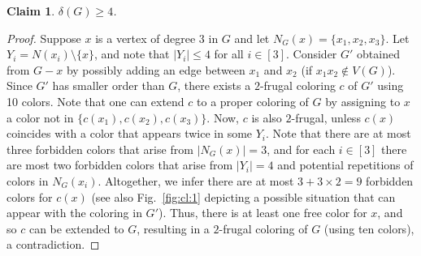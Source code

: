\documentclass[11pt]{article}
\newtheorem{claim}{Claim}
\begin{document}

\begin{claim} $\delta(G)\ge 4$.
\label{cl:1}
\end{claim} 
\begin{proof}
Suppose $x$ is a vertex of degree $3$ in $G$ and let $N_G(x)=\{x_1,x_2,x_3\}$. Let $Y_i=N(x_i)\setminus\{x\}$, and note that $|Y_i|\le 4$ for all $i\in [3]$. Consider $G'$ obtained from $G-x$ by possibly adding an edge between $x_1$ and $x_2$ (if $x_1x_2\notin V(G)$). Since $G'$ has smaller order than $G$, there exists a $2$-frugal coloring $c$ of $G'$ using 10 colors. Note that one can extend $c$ to a proper coloring of $G$ by assigning to $x$ a color not in $\{c(x_1),c(x_2),c(x_3)\}$. Now, $c$ is also $2$-frugal, unless $c(x)$ coincides with a color that appears twice in some $Y_i$. Note that there are at most three forbidden colors that arise from $|N_G(x)|=3$, and for each $i\in [3]$ there are most two forbidden colors that arise from $|Y_i|=4$ and potential repetitions of colors in $N_G(x_i)$. Altogether, we infer there are at most $3+3\times 2=9$ forbidden colors for $c(x)$ (see also Fig.~\ref{fig:cl:1} depicting a possible situation that can appear with the coloring in $G'$). Thus, there is at least one free color for $x$, and so $c$ can be extended to $G$, resulting in a $2$-frugal coloring of $G$ (using ten colors), a contradiction.
\end{proof}
\end{document}
